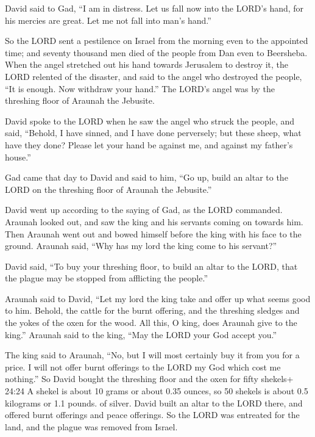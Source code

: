 David said to Gad, ``I am in distress. Let us fall now
into the LORD's hand, for his mercies are great. Let me not fall into
man's hand.''

 So the LORD sent a pestilence on Israel from the morning
even to the appointed time; and seventy thousand men died of the people
from Dan even to Beersheba.  When the angel stretched out
his hand towards Jerusalem to destroy it, the LORD relented of the
disaster, and said to the angel who destroyed the people, ``It is
enough. Now withdraw your hand.'' The LORD's angel was by the threshing
floor of Araunah the Jebusite.

 David spoke to the LORD when he saw the angel who struck
the people, and said, ``Behold, I have sinned, and I have done
perversely; but these sheep, what have they done? Please let your hand
be against me, and against my father's house.''

 Gad came that day to David and said to him, ``Go up, build
an altar to the LORD on the threshing floor of Araunah the Jebusite.''

 David went up according to the saying of Gad, as the LORD
commanded.  Araunah looked out, and saw the king and his
servants coming on towards him. Then Araunah went out and bowed himself
before the king with his face to the ground.  Araunah said,
``Why has my lord the king come to his servant?''

David said, ``To buy your threshing floor, to build an altar to the
LORD, that the plague may be stopped from afflicting the people.''

 Araunah said to David, ``Let my lord the king take and
offer up what seems good to him. Behold, the cattle for the burnt
offering, and the threshing sledges and the yokes of the oxen for the
wood.  All this, O king, does Araunah give to the king.''
Araunah said to the king, ``May the LORD your God accept you.''

 The king said to Araunah, ``No, but I will most certainly
buy it from you for a price. I will not offer burnt offerings to the
LORD my God which cost me nothing.'' So David bought the threshing floor
and the oxen for fifty shekels+ 24:24 A shekel is about 10 grams or
about 0.35 ounces, so 50 shekels is about 0.5 kilograms or 1.1 pounds.
of silver.  David built an altar to the LORD there, and
offered burnt offerings and peace offerings. So the LORD was entreated
for the land, and the plague was removed from Israel.

